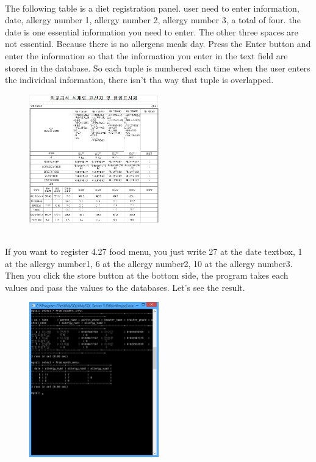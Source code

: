 \documentclass[a4paper,11pt]{IEEEtran}
\begin{document}
{{{\begin{figure}[!h]
        \caption{}
        \label{fig1}
\end{figure}
~\\
The following table is a diet registration panel. user need to enter information, date, allergy number 1, allergy number 2, allergy number 3, a total of four. the date is one essential information you need to enter. The other three spaces are not essential. Because there is no allergens meals day. Press the Enter button and enter the information so that the information you enter in the text field are stored in the database. So each tuple is numbered  each time when the user enters the individual information, there isn't tha way that tuple is overlapped.
~\\
\begin{figure}[!h]
        \centering
        \includegraphics[width=0.5\textwidth, height=0.5\textheight]{usec13.jpg}
        \caption{}
        \label{fig1}
\end{figure}
~\\
If you want to register 4.27 food menu, you just write 27 at the date textbox, 1 at the allergy number1, 6 at the allergy number2, 10 at the allergy number3. Then you click the store button at the bottom side, the program takes each values and pass the values to the databases. Let’s see the result.
~\\
\newpage
\begin{figure}[!h]
        \centering
        \includegraphics[width=0.5\textwidth, height=0.4\textheight]{usec14.jpg}

\end{figure}}}}
\end{document}
